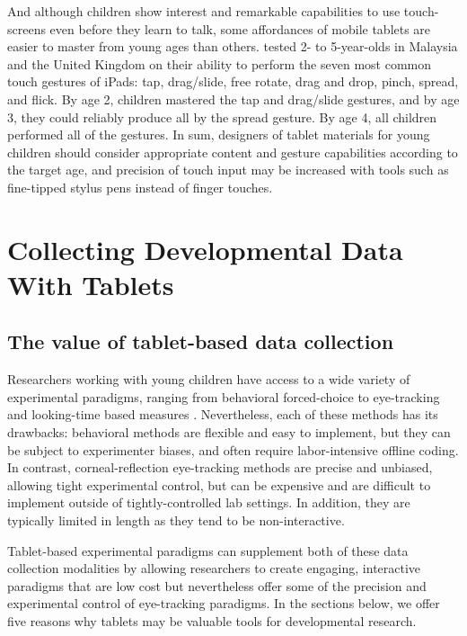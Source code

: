 \documentclass[man,noapacite]{apa2}
\begin{document}
And although children show interest and remarkable capabilities to use touch-screens even before they learn to talk, some affordances of mobile tablets are easier to master from young ages than others.  tested 2- to 5-year-olds in Malaysia and the United Kingdom on their ability to perform the seven most common touch gestures of iPads: tap, drag/slide, free rotate, drag and drop, pinch, spread, and flick. By age 2, children mastered the tap and drag/slide gestures, and by age 3, they could reliably produce all by the spread gesture. By age 4, all children performed all of the gestures. In sum, designers of tablet materials for young children should consider appropriate content and gesture capabilities according to the target age, and precision of touch input may be increased with tools such as fine-tipped stylus pens instead of finger touches.

\section{Collecting Developmental Data With Tablets}

\subsection{The value of tablet-based data collection}

Researchers working with young children have access to a wide variety of experimental paradigms, ranging from behavioral forced-choice to eye-tracking and looking-time based measures \cite{aslin2007,gredeback2009}. Nevertheless, each of these methods has its drawbacks: behavioral methods are flexible and easy to implement, but they can be subject to experimenter biases, and often require labor-intensive offline coding. In contrast, corneal-reflection eye-tracking methods are precise and unbiased, allowing tight experimental control, but can be expensive and are difficult to implement outside of tightly-controlled lab settings. In addition, they are typically limited in length as they tend to be non-interactive.

Tablet-based experimental paradigms can supplement both of these data collection modalities by allowing researchers to create engaging, interactive paradigms that are low cost but nevertheless offer some of the precision and experimental control of eye-tracking paradigms. In the sections below, we offer five reasons why tablets may be valuable tools for developmental research.
\end{document}
